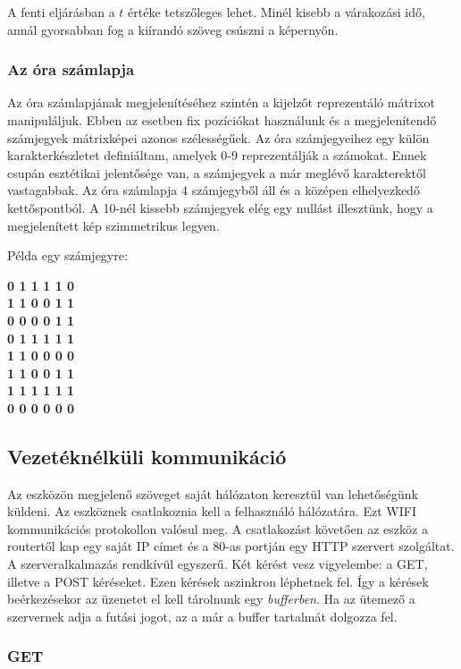 \documentclass[a4paper, 12pt]{article}
\begin{document}
A fenti eljárásban a $t$ értéke tetszőleges lehet. Minél kisebb a várakozási idő, annál gyorsabban fog a kiírandó szöveg csúszni a képernyőn.

\subsubsection{Az óra számlapja}
Az óra számlapjának megjelenítéséhez szintén a kijelzőt reprezentáló mátrixot manipuláljuk.
Ebben az esetben fix pozíciókat használunk és a megjelenítendő számjegyek mátrixképei azonos szélességűek.
Az óra számjegyeihez egy külön karakterkészletet definiáltam, amelyek 0-9 reprezentálják a számokat. Ennek csupán esztétikai jelentősége van, a számjegyek a már meglévő karakterektől vastagabbak.
Az óra számlapja 4 számjegyből áll és a középen elhelyezkedő kettőspontból.
A 10-nél kissebb számjegyek elég egy nullást illesztünk, hogy a megjelenített kép szimmetrikus legyen.

Példa egy számjegyre:

\begin{center}
\textbf{0 1 1 1 1 0\\
1 1 0 0 1 1\\
0 0 0 0 1 1\\
0 1 1 1 1 1\\
1 1 0 0 0 0\\
1 1 0 0 1 1\\
1 1 1 1 1 1\\
0 0 0 0 0 0}
\end{center}


\subsection{Vezetéknélküli kommunikáció}
Az eszközön megjelenő szöveget saját hálózaton keresztül van lehetőségünk küldeni. Az eszköznek csatlakoznia kell a felhasználó hálózatára. Ezt WIFI kommunikációs protokollon valósul meg. A csatlakozást követően az eszköz a routertől kap egy saját IP címet és a 80-as portján egy HTTP szervert szolgáltat.
A szerveralkalmazás rendkívül egyszerű. Két kérést vesz vigyelembe: a GET, illetve a POST kéréseket.
Ezen kérések aszinkron léphetnek fel. Így a kérések beérkezésekor az üzenetet el kell tárolnunk egy \textit{bufferben}. Ha az ütemező a szervernek adja a futási jogot, az a már a buffer tartalmát dolgozza fel.

\subsubsection{GET}
\end{document}
